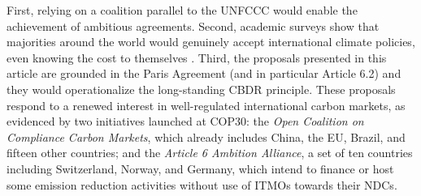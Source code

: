 \documentclass[12pt,english]{article}
\begin{document}
First, relying on a coalition parallel to the UNFCCC would enable the achievement of ambitious agreements. %
Second, %
academic surveys show that majorities around the world would genuinely accept international climate policies, even knowing the cost to themselves \citep{fabre_majority_2025,fabre_public_2025,andre_globally_2024}. %
Third, the proposals presented in this article are grounded in the Paris Agreement (and in particular Article 6.2) and they would operationalize the long-standing CBDR principle. These proposals respond to a renewed interest in well-regulated international carbon markets, as evidenced by two initiatives launched at COP30: the \textit{Open Coalition on Compliance Carbon Markets}, which already includes China, the EU, Brazil, and fifteen other countries; and the \textit{Article 6 Ambition Alliance}, a set of ten countries including Switzerland, Norway, and Germany, which intend to finance or host some emission reduction activities without use of ITMOs towards their NDCs.
\end{document}
